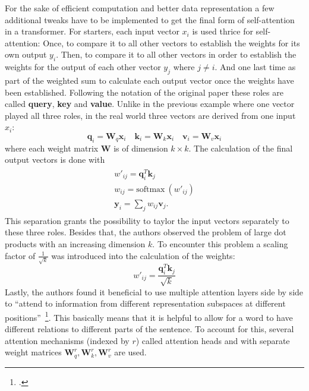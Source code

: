 For the sake of efficient computation and better data representation a few additional tweaks have to be implemented to get the final form of self-attention in a transformer. For starters, each input vector $ x_i $ is used thrice for self-attention: Once, to compare it to all other vectors to establish the weights for its own output $ y_i $. Then, to compare it to all other vectors in order to establish the weights for the output of each other vector $ y_j $ where $ j \neq i $. And one last time as part of the weighted sum to calculate each output vector once the weights have been established. Following the notation of the original paper these roles are called \textbf{query}, \textbf{key} and \textbf{value}. Unlike in the previous example where one vector played all three roles, in the real world three vectors are derived from one input $ x_i $:
\begin{equation}
	\boldsymbol{q}_i = \boldsymbol{W}_q \boldsymbol{x}_i \quad \boldsymbol{k}_i = \boldsymbol{W}_k \boldsymbol{x}_i \quad \boldsymbol{v}_i = \boldsymbol{W}_v \boldsymbol{x}_i
\end{equation}
where each weight matrix $ \boldsymbol{W} $ is of dimension $ k \times k $. The calculation of the final output vectors is done with
\begin{align}
	\begin{split}
		w'_{ij} = \boldsymbol{q}_i^T \boldsymbol{k}_j \\
		w_{ij} = \text{softmax} \ (w'_{ij}) \\
		\boldsymbol{y}_i = \sum_j w_{ij} \boldsymbol{v}_j.
	\end{split}
\end{align}
This separation grants the possibility to taylor the input vectors separately to these three roles. Besides that, the authors observed the problem of large dot products with an increasing dimension $ k $. To encounter this problem a scaling factor of $ \frac{1}{\sqrt{k}} $ was introduced into the calculation of the weights:
\begin{equation}
	w'_{ij} = \frac{\boldsymbol{q}_i^T \boldsymbol{k}_j}{\sqrt{k}}
\end{equation}
Lastly, the authors found it beneficial to use multiple attention layers side by side to ``attend to information from different representation subspaces at different positions''~\footcite[5]{DBLP:journals/corr/VaswaniSPUJGKP17}. This basically means that it is helpful to allow for a word to have different relations to different parts of the sentence. To account for this, several attention mechanisms (indexed by $ r $) called attention heads and with separate weight matrices $ \boldsymbol{W}_q^r, \boldsymbol{W}_k^r, \boldsymbol{W}_v^r $ are used.

